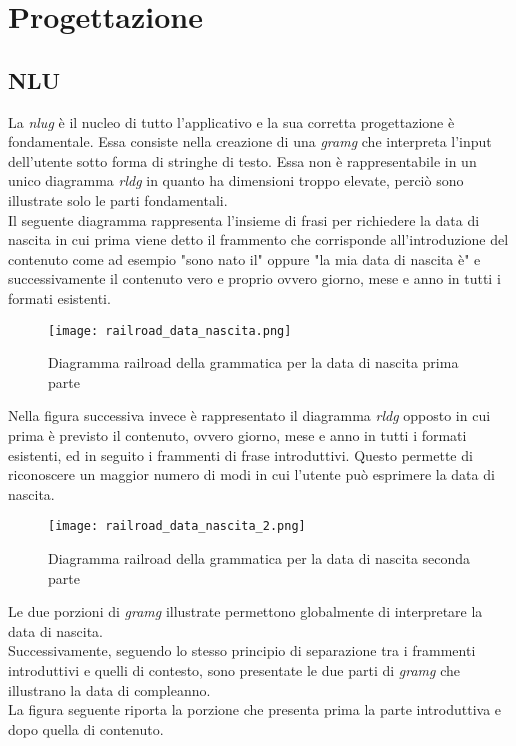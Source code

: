 \section{Progettazione}
	\subsection{NLU}
	La \emph{\gls{nlug}} è il nucleo di tutto l'applicativo e la sua corretta progettazione è fondamentale. Essa consiste nella creazione di una \emph{\gls{gramg}} che interpreta l'input dell'utente sotto forma di stringhe di testo. Essa non è rappresentabile in un unico diagramma \emph{\gls{rldg}} in quanto ha dimensioni troppo elevate, perciò sono illustrate solo le parti fondamentali. \\
	Il seguente diagramma rappresenta l'insieme di frasi per richiedere la data di nascita in cui prima viene detto il frammento che corrisponde all'introduzione del contenuto come ad esempio "sono nato il" oppure "la mia data di nascita è" e successivamente il contenuto vero e proprio ovvero giorno, mese e anno in tutti i formati esistenti. 
		
	\begin{figure}[htbp]
		\begin{center}
			\texttt{[image: railroad\_data\_nascita.png]}
			\caption{Diagramma railroad della grammatica per la data di nascita prima parte}
		\end{center}
	\end{figure}

	\pagebreak
	
	Nella figura successiva invece è rappresentato il diagramma \emph{\gls{rldg}} opposto in cui prima è previsto il contenuto, ovvero giorno, mese e anno in tutti i formati esistenti, ed in seguito i frammenti di frase introduttivi. Questo permette di riconoscere un maggior numero di modi in cui l'utente può esprimere la data di nascita.
	
	\begin{figure}[htbp]
		\begin{center}
			\texttt{[image: railroad\_data\_nascita\_2.png]}
			\caption{Diagramma railroad della grammatica per la data di nascita seconda parte}
		\end{center}
	\end{figure}

	Le due porzioni di \emph{\gls{gramg}} illustrate permettono globalmente di interpretare la data di nascita. \\
	Successivamente, seguendo lo stesso principio di separazione tra i frammenti introduttivi e quelli di contesto, sono presentate le due parti di \emph{\gls{gramg}} che illustrano la data di compleanno. \\
	La figura seguente riporta la porzione che presenta prima la parte introduttiva e dopo quella di contenuto.
	
